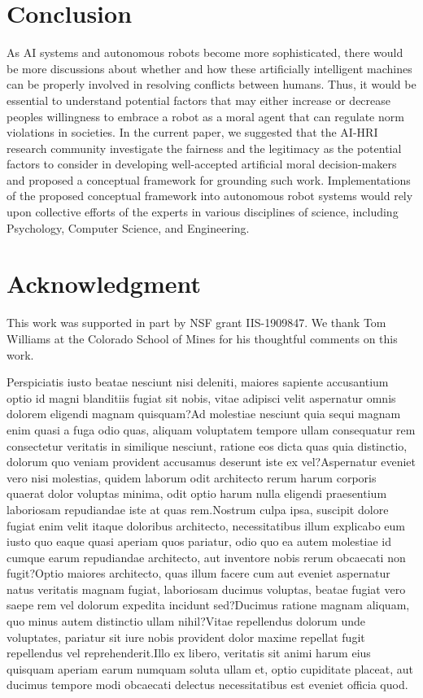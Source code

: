 \documentclass{article} %
\begin{document}
\section{Conclusion}
As AI systems and autonomous robots become more sophisticated, there would be more discussions about whether and how these artificially intelligent machines can be properly involved in resolving conflicts between humans. Thus, it would be essential to understand potential factors that may either increase or decrease peoples willingness to embrace a robot as a moral agent that can regulate norm violations in societies. In the current paper, we suggested that the AI-HRI research community investigate the fairness and the legitimacy as the potential factors to consider in developing well-accepted artificial moral decision-makers and proposed a conceptual framework for grounding such work. Implementations of the proposed conceptual framework into autonomous robot systems would rely upon collective efforts of the experts in various disciplines of science, including Psychology, Computer Science, and Engineering.

\section{Acknowledgment}
This work was supported in part by NSF grant IIS-1909847. We thank Tom Williams at the Colorado School of Mines for his thoughtful comments on this work.

  Perspiciatis iusto beatae nesciunt nisi deleniti, maiores sapiente accusantium optio id magni blanditiis fugiat sit nobis, vitae adipisci velit aspernatur omnis dolorem eligendi magnam quisquam?Ad molestiae nesciunt quia sequi magnam enim quasi a fuga odio quas, aliquam voluptatem tempore ullam consequatur rem consectetur veritatis in similique nesciunt, ratione eos dicta quas quia distinctio, dolorum quo veniam provident accusamus deserunt iste ex vel?Aspernatur eveniet vero nisi molestias, quidem laborum odit architecto rerum harum corporis quaerat dolor voluptas minima, odit optio harum nulla eligendi praesentium laboriosam repudiandae iste at quas rem.Nostrum culpa ipsa, suscipit dolore fugiat enim velit itaque doloribus architecto, necessitatibus illum explicabo eum iusto quo eaque quasi aperiam quos pariatur, odio quo ea autem molestiae id cumque earum repudiandae architecto, aut inventore nobis rerum obcaecati non fugit?Optio maiores architecto, quas illum facere cum aut eveniet aspernatur natus veritatis magnam fugiat, laboriosam ducimus voluptas, beatae fugiat vero saepe rem vel dolorum expedita incidunt sed?Ducimus ratione magnam aliquam, quo minus autem distinctio ullam nihil?Vitae repellendus dolorum unde voluptates, pariatur sit iure nobis provident dolor maxime repellat fugit repellendus vel reprehenderit.Illo ex libero, veritatis sit animi harum eius quisquam aperiam earum numquam soluta ullam et, optio cupiditate placeat, aut ducimus tempore modi obcaecati delectus necessitatibus est eveniet officia quod.\clearpage

\end{document}
